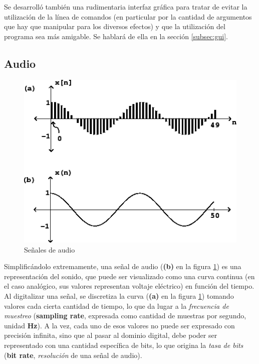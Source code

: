 \documentclass[a4paper,spanish,12pt]{article}
\begin{document}
Se desarrolló también una rudimentaria interfaz gráfica para tratar de evitar la utilización de la línea de comandos (en particular por la cantidad de argumentos que hay que manipular para los diversos efectos) y que la utilización del programa sea más amigable. Se hablará de ella en la sección \ref{subsec:gui}.

\newpage\subsection{Audio}
\label{subsec:audio}

\begin{figure}[H]
    \centering
    \includegraphics[scale=0.6]{imagenes/signals.png}
    \caption{Señales de audio}
    \label{fig:signals}
\end{figure}

Simplificándolo extremamente, una señal de audio (\textbf{(b)} en la figura \ref{fig:signals}) es una representación del sonido, que puede ser visualizado como una curva continua (en el caso analógico, sus valores representan voltaje eléctrico) en función del tiempo. Al digitalizar una señal, se discretiza la curva (\textbf{(a)} en la figura \ref{fig:signals}) tomando valores cada cierta cantidad de tiempo, lo que da lugar a la \textit{frecuencia de muestreo} (\textbf{sampling rate}, expresada como cantidad de muestras por segundo, unidad \textbf{Hz}). A la vez, cada uno de esos valores no puede ser expresado con precisión infinita, sino que al pasar al dominio digital, debe poder ser representado con una cantidad específica de bits, lo que origina la \textit{tasa de bits} (\textbf{bit rate}, \textit{resolución} de una señal de audio). \vspace{\baselineskip}
\end{document}
